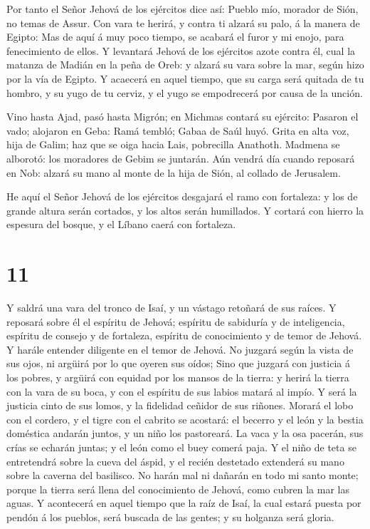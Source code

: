  Por tanto el Señor Jehová de los ejércitos dice así:
Pueblo mío, morador de Sión, no temas de Assur. Con vara te herirá, y
contra ti alzará su palo, á la manera de Egipto:  Mas de
aquí á muy poco tiempo, se acabará el furor y mi enojo, para
fenecimiento de ellos.  Y levantará Jehová de los ejércitos
azote contra él, cual la matanza de Madián en la peña de Oreb: y alzará
su vara sobre la mar, según hizo por la vía de Egipto.  Y
acaecerá en aquel tiempo, que su carga será quitada de tu hombro, y su
yugo de tu cerviz, y el yugo se empodrecerá por causa de la unción.

 Vino hasta Ajad, pasó hasta Migrón; en Michmas contará su
ejército:  Pasaron el vado; alojaron en Geba: Ramá tembló;
Gabaa de Saúl huyó.  Grita en alta voz, hija de Galim; haz
que se oiga hacia Lais, pobrecilla Anathoth.  Madmena se
alborotó: los moradores de Gebim se juntarán.  Aún vendrá
día cuando reposará en Nob: alzará su mano al monte de la hija de Sión,
al collado de Jerusalem.

 He aquí el Señor Jehová de los ejércitos desgajará el ramo
con fortaleza: y los de grande altura serán cortados, y los altos serán
humillados.  Y cortará con hierro la espesura del bosque, y
el Líbano caerá con fortaleza.

\hypertarget{section-10}{%
\section{11}\label{section-10}}

 Y saldrá una vara del tronco de Isaí, y un vástago retoñará
de sus raíces.  Y reposará sobre él el espíritu de Jehová;
espíritu de sabiduría y de inteligencia, espíritu de consejo y de
fortaleza, espíritu de conocimiento y de temor de Jehová.  Y
harále entender diligente en el temor de Jehová. No juzgará según la
vista de sus ojos, ni argüirá por lo que oyeren sus oídos; 
Sino que juzgará con justicia á los pobres, y argüirá con equidad por
los mansos de la tierra: y herirá la tierra con la vara de su boca, y
con el espíritu de sus labios matará al impío.  Y será la
justicia cinto de sus lomos, y la fidelidad ceñidor de sus riñones.
 Morará el lobo con el cordero, y el tigre con el cabrito se
acostará: el becerro y el león y la bestia doméstica andarán juntos, y
un niño los pastoreará.  La vaca y la osa pacerán, sus crías
se echarán juntas; y el león como el buey comerá paja.  Y el
niño de teta se entretendrá sobre la cueva del áspid, y el recién
destetado extenderá su mano sobre la caverna del basilisco. 
No harán mal ni dañarán en todo mi santo monte; porque la tierra será
llena del conocimiento de Jehová, como cubren la mar las aguas.
 Y acontecerá en aquel tiempo que la raíz de Isaí, la cual
estará puesta por pendón á los pueblos, será buscada de las gentes; y su
holganza será gloria.

